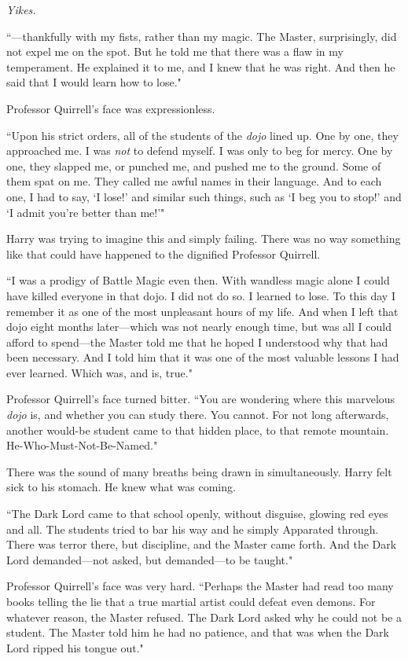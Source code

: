 \emph{Yikes.}

``—thankfully with my fists, rather than my magic. The Master, surprisingly, did not expel me on the spot. But he told me that there was a flaw in my temperament. He explained it to me, and I knew that he was right. And then he said that I would learn how to lose."

Professor Quirrell's face was expressionless.

``Upon his strict orders, all of the students of the \emph{dojo} lined up. One by one, they approached me. I was \emph{not} to defend myself. I was only to beg for mercy. One by one, they slapped me, or punched me, and pushed me to the ground. Some of them spat on me. They called me awful names in their language. And to each one, I had to say, `I lose!' and similar such things, such as `I beg you to stop!' and `I admit you're better than me!'"

Harry was trying to imagine this and simply failing. There was no way something like that could have happened to the dignified Professor Quirrell.

``I was a prodigy of Battle Magic even then. With wandless magic alone I could have killed everyone in that dojo. I did not do so. I learned to lose. To this day I remember it as one of the most unpleasant hours of my life. And when I left that dojo eight months later—which was not nearly enough time, but was all I could afford to spend—the Master told me that he hoped I understood why that had been necessary. And I told him that it was one of the most valuable lessons I had ever learned. Which was, and is, true."

Professor Quirrell's face turned bitter. ``You are wondering where this marvelous \emph{dojo} is, and whether you can study there. You cannot. For not long afterwards, another would-be student came to that hidden place, to that remote mountain. He-Who-Must-Not-Be-Named."

There was the sound of many breaths being drawn in simultaneously. Harry felt sick to his stomach. He knew what was coming.

``The Dark Lord came to that school openly, without disguise, glowing red eyes and all. The students tried to bar his way and he simply Apparated through. There was terror there, but discipline, and the Master came forth. And the Dark Lord demanded—not asked, but demanded—to be taught."

Professor Quirrell's face was very hard. ``Perhaps the Master had read too many books telling the lie that a true martial artist could defeat even demons. For whatever reason, the Master refused. The Dark Lord asked why he could not be a student. The Master told him he had no patience, and that was when the Dark Lord ripped his tongue out."

